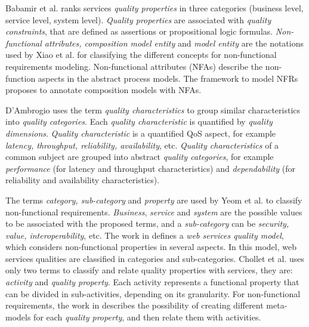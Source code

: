\documentclass{sig-alternate}
\begin{document}
\bigskip

Babamir et al.\cite{Babamir2010} ranks services \textit{quality properties}
in three categories (business level, service level, system level).
\textit{Quality properties} are associated with \textit{quality constraints},
that are defined as assertions or propositional logic formulas.
\textit{Non-functional attributes, composition mo\-del entity} and \textit{mo\-del entity} are the notations used by
Xiao et al. \cite{XiaoCZBOLH08} for classifying the different concepts for
non-functional requirements modeling. Non-functional attributes (NFAs) describe
the non-function aspects in the abstract process models. The framework to
model NFRs proposes to annotate composition models with NFAs.

D'Ambrogio \cite{DAmbrogio06} uses the term \textit{quality characteristics}
to group similar characteristics into \textit{quality categories}. Each
\textit{quality characteristic} is quantified by \textit{quality dimensions}.
\textit{Quality characteristic} is a quantified QoS aspect, for example
\textit{latency, throughput, reliability, availability}, etc. \textit{Quality
characteristics} of a common subject are grouped into abstract \textit{quality
categories}, for example \textit{performance} (for latency and throughput characteristics) and
\textit{dependability} (for reliability and availability characteristics).  
 
The terms \textit{category, sub-category}
and \textit{property}  are used by Yeom
et al.\cite{Yeom2006} to classify non-functional requirements.
\textit{Business}, \textit{service} and \textit{system} are the possible values to be associated
with the proposed terms, and a \textit{sub-category} can be \textit{security,
value, interoperability}, etc. The work in \cite{Yeom2006} defines a \textit{web
services quality model}, which considers non-functional properties in several
aspects. In this model, web services qualities are classified in categories and
sub-categories. Chollet et al.\cite{CholletL09} uses only two terms to
classify and relate quality properties with services, they are:
\textit{activity} and \textit{quality property}. Each activity represents a
functional property that can be divided in sub-activities, depending on its
granularity. For non-functional requirements, the work in \cite{CholletL09}
describes the possibility of creating different meta-models for each
\textit{quality property}, and then relate them with activities.   
\end{document}
